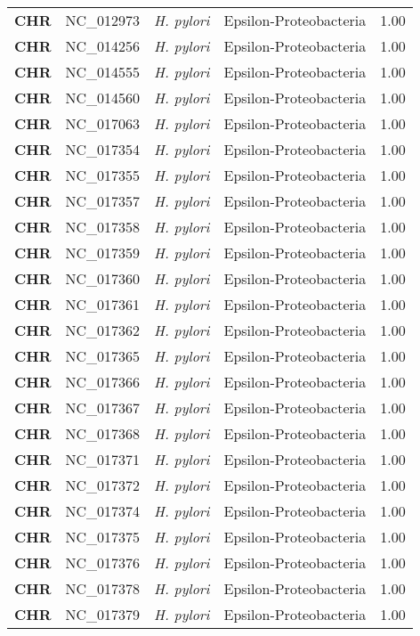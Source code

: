 \begin{adjustwidth}{-3cm}{2cm}
{\begin{supertabular}{>{\bfseries}l|p{0.1\textwidth}p{0.14\textwidth}l|l}
CHR & NC\_012973 & \textit{H. pylori} & Epsilon-Proteobacteria & 1.00\\
CHR & NC\_014256 & \textit{H. pylori} & Epsilon-Proteobacteria & 1.00\\
CHR & NC\_014555 & \textit{H. pylori} & Epsilon-Proteobacteria & 1.00\\
CHR & NC\_014560 & \textit{H. pylori} & Epsilon-Proteobacteria & 1.00\\
CHR & NC\_017063 & \textit{H. pylori} & Epsilon-Proteobacteria & 1.00\\
CHR & NC\_017354 & \textit{H. pylori} & Epsilon-Proteobacteria & 1.00\\
CHR & NC\_017355 & \textit{H. pylori} & Epsilon-Proteobacteria & 1.00\\
CHR & NC\_017357 & \textit{H. pylori} & Epsilon-Proteobacteria & 1.00\\
CHR & NC\_017358 & \textit{H. pylori} & Epsilon-Proteobacteria & 1.00\\
CHR & NC\_017359 & \textit{H. pylori} & Epsilon-Proteobacteria & 1.00\\
CHR & NC\_017360 & \textit{H. pylori} & Epsilon-Proteobacteria & 1.00\\
CHR & NC\_017361 & \textit{H. pylori} & Epsilon-Proteobacteria & 1.00\\
CHR & NC\_017362 & \textit{H. pylori} & Epsilon-Proteobacteria & 1.00\\
CHR & NC\_017365 & \textit{H. pylori} & Epsilon-Proteobacteria & 1.00\\
CHR & NC\_017366 & \textit{H. pylori} & Epsilon-Proteobacteria & 1.00\\
CHR & NC\_017367 & \textit{H. pylori} & Epsilon-Proteobacteria & 1.00\\
CHR & NC\_017368 & \textit{H. pylori} & Epsilon-Proteobacteria & 1.00\\
CHR & NC\_017371 & \textit{H. pylori} & Epsilon-Proteobacteria & 1.00\\
CHR & NC\_017372 & \textit{H. pylori} & Epsilon-Proteobacteria & 1.00\\
CHR & NC\_017374 & \textit{H. pylori} & Epsilon-Proteobacteria & 1.00\\
CHR & NC\_017375 & \textit{H. pylori} & Epsilon-Proteobacteria & 1.00\\
CHR & NC\_017376 & \textit{H. pylori} & Epsilon-Proteobacteria & 1.00\\
CHR & NC\_017378 & \textit{H. pylori} & Epsilon-Proteobacteria & 1.00\\
CHR & NC\_017379 & \textit{H. pylori} & Epsilon-Proteobacteria & 1.00\\

\end{supertabular}}
\end{adjustwidth}
